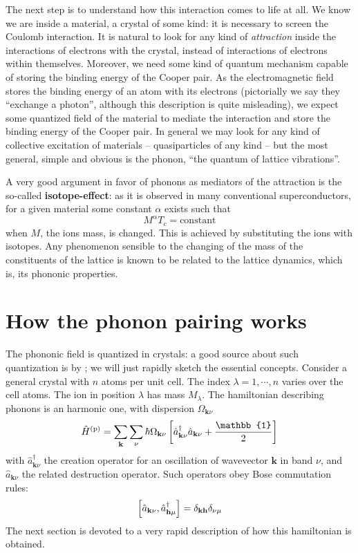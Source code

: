 The next step is to understand how this interaction comes to life at all. We know we are inside a material, a crystal of some kind: it is necessary to screen the Coulomb interaction. It is natural to look for any kind of \textit{attraction} inside the interactions of electrons with the crystal, instead of interactions of electrons within themselves. Moreover, we need some kind of quantum mechanism capable of storing the binding energy of the Cooper pair. As the electromagnetic field stores the binding energy of an atom with its electrons (pictorially we say they ``exchange a photon'', although this description is quite misleading), we expect some quantized field of the material to mediate the interaction and store the binding energy of the Cooper pair. In general we may look for any kind of collective excitation of materials -- quasiparticles of any kind -- but the most general, simple and obvious is the phonon, ``the quantum of lattice vibrations''.

A very good argument in favor of phonons as mediators of the attraction is the so-called \textbf{isotope-effect}: as it is observed in many conventional superconductors, for a given material some constant $\alpha$ exists such that 
\[
	M^\alpha T_c = \mathrm{constant}
\]
when $M$, the ions mass, is changed. This is achieved by substituting the ions with isotopes. Any phenomenon sensible to the changing of the mass of the constituents of the lattice is known to be related to the lattice dynamics, which is, its phononic properties.

\section{How the phonon pairing works}

The phononic field is quantized in crystals: a good source about such quantization is  \cite{grosso2000solid} by \citeauthor{grosso2000solid}; we will just rapidly sketch the essential concepts.
Consider a general crystal with $n$ atoms per unit cell. The index $\lambda = 1,\cdots,n$ varies over the cell atoms. The ion in position $\lambda$ has mass $M_\lambda$. The hamiltonian describing phonons is an harmonic one, with dispersion $\Omega_{\mathbf{k}\nu}$
\begin{equation}\label{eq:born-oppenheimer phonon hamiltonian}
	\hat H^{(\mathrm{p})} = \sum_\mathbf{k} \sum_\nu  \hbar \Omega_{\mathbf{k}\nu} \lrS{\hat a_{\mathbf{k}\nu}^\dagger \hat a_{\mathbf{k}\nu} + \frac{\mathbb{1}}{2}}
\end{equation}
with $\hat a_{\mathbf{k}\nu}^\dagger$ the creation operator for an oscillation of wavevector $\mathbf{k}$ in band $\nu$, and $\hat a_{\mathbf{k}\nu}$ the related destruction operator.  Such operators obey Bose commutation rules:
\[
	\comm{\hat a_{\mathbf{k}\nu}}{ \hat a_{\mathbf{h}\mu}^\dagger} = \delta_{\mathbf{k}\mathbf{h}}
	\delta_{\nu\mu}
\]
The next section is devoted to a very rapid description of how this hamiltonian is obtained.

